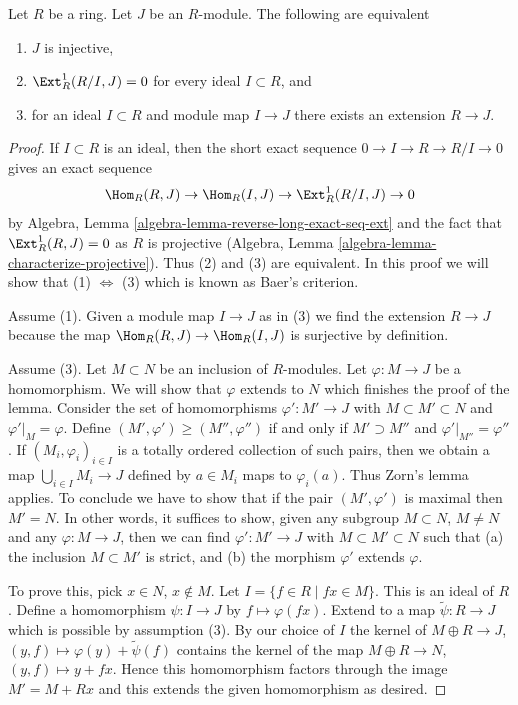 \begin{lemma}
\label{lemma-characterize-injective-bis}
Let $R$ be a ring. Let $J$ be an $R$-module.
The following are equivalent
\begin{enumerate}
\item $J$ is injective,
\item $\Ext^1_R(R/I, J) = 0$ for every ideal $I \subset R$, and
\item for an ideal $I \subset R$ and module map $I \to J$
there exists an extension $R \to J$.
\end{enumerate}
\end{lemma}

\begin{proof}
If $I \subset R$ is an ideal, then the short exact sequence
$0 \to I \to R \to R/I \to 0$ gives an exact sequence
$$
\Hom_R(R, J) \to
\Hom_R(I, J) \to
\Ext^1_R(R/I, J) \to 0
$$
by Algebra, Lemma \ref{algebra-lemma-reverse-long-exact-seq-ext}
and the fact that $\Ext^1_R(R, J) = 0$ as $R$ is projective
(Algebra, Lemma \ref{algebra-lemma-characterize-projective}).
Thus (2) and (3) are equivalent. In this proof
we will show that (1) $\Leftrightarrow$ (3) which is known
as Baer's criterion.

\medskip\noindent
Assume (1). Given a module map $I \to J$ as in (3) we find
the extension $R \to J$ because the map
$\Hom_R(R, J) \to \Hom_R(I, J)$ is surjective
by definition.

\medskip\noindent
Assume (3). Let $M \subset N$ be an inclusion of $R$-modules.
Let $\varphi : M \to J$ be a homomorphism. We will show that $\varphi$
extends to $N$ which finishes the proof of the lemma.
Consider the set of homomorphisms $\varphi' : M' \to J$
with $M \subset M' \subset N$ and $\varphi'|_M = \varphi$.
Define $(M', \varphi') \geq (M'', \varphi'')$ if
and only if $M' \supset M''$ and $\varphi'|_{M''} = \varphi''$.
If $(M_i, \varphi_i)_{i \in I}$ is a totally
ordered collection of such pairs, then we obtain a map
$\bigcup_{i \in I} M_i \to J$ defined by $a \in M_i$
maps to $\varphi_i(a)$. Thus Zorn's lemma applies.
To conclude we have to show that if the pair
$(M', \varphi')$ is maximal then $M' = N$.
In other words, it suffices to show, given
any subgroup $M \subset N$, $M \not = N$ and
any $\varphi : M \to J$, then we can find
$\varphi' : M' \to J$ with $M \subset M' \subset N$
such that (a) the inclusion $M \subset M'$ is strict, and
(b) the morphism $\varphi'$ extends $\varphi$.

\medskip\noindent
To prove this, pick $x \in N$, $x \not \in M$.
Let $I = \{f \in R \mid fx \in M\}$. This is an ideal of $R$.
Define a homomorphism $\psi : I \to J$ by $f \mapsto \varphi(fx)$.
Extend to a map $\tilde\psi : R \to J$ which is possible by assumption (3).
By our choice of $I$ the kernel of
$M \oplus R \to J$, $(y, f) \mapsto \varphi(y) + \tilde\psi(f)$
contains the kernel of the map $M \oplus R \to N$,
$(y, f) \mapsto y + fx$. Hence this homomorphism factors
through the image $M' = M + Rx$ and this extends the given homomorphism
as desired.
\end{proof}

